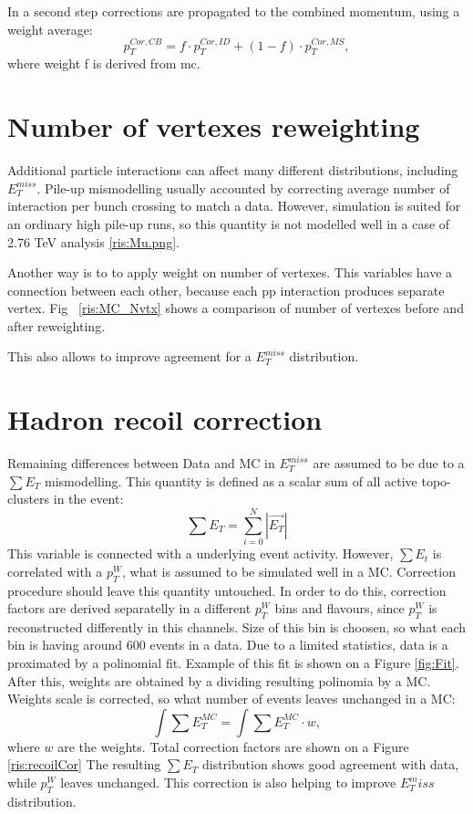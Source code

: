 In a second step corrections are propagated to the combined momentum, using a weight average:
\begin{equation}
p_T^{Cor,CB}= f\cdot p_T^{Cor,ID}+(1-f) \cdot p_T^{Cor,MS},
\end{equation}
where weight f is derived from mc. 

\section{Number of vertexes reweighting}
Additional particle interactions can affect many different distributions, including $E_T^{miss}$. Pile-up mismodelling usually accounted by correcting average number of interaction per bunch crossing to match a data. However, \atlas simulation is suited for an ordinary high pile-up runs, so this quantity is not modelled well in a case of 2.76 TeV analysis \ref{ris:Mu.png}. 

Another way is to to apply weight on number of vertexes. This variables have a connection between each other, because each pp interaction produces separate vertex. Fig ~\ref{ris:MC_Nvtx} shows a comparison of number of vertexes before and after reweighting.

This also allows to improve agreement for a $E_T^{miss}$ distribution.

\section{Hadron recoil correction}
Remaining differences between Data and MC in $E_T^{miss}$ are assumed to be due to a $\sum E_T$ mismodelling. This quantity is defined as a scalar sum of all active topo-clusters in the event:
\begin{equation}
\sum E_T = \sum\limits^N_{i=0}|\vec{E_T}|
\end{equation}
This variable is connected with a underlying event activity. 
However, $\sum E_t$ is correlated with a $p_T^W$, what is assumed to be simulated well in a MC. Correction procedure should leave this quantity untouched. In order to do this, correction factors are derived separatelly in a different $p_T^W$ bins and flavours, since $p_T^W$ is reconstructed differently in this channels. Size of this bin is choosen, so what each bin is having around 600 events in a data. Due to a limited statistics, data is a proximated by a polinomial fit. Example of this fit is shown on a Figure \ref{fig:Fit}. After this, weights are obtained by a dividing resulting polinomia by a MC. Weights scale is corrected, so what number of events leaves unchanged in a MC:
\begin{equation}
\int \sum E_T^{MC} = \int \sum E_T^{MC} \cdot w,
\end{equation}
where $w$ are the weights. Total correction factors are shown on a Figure \ref{ris:recoilCor}
The resulting $\sum E_T$ distribution shows good agreement with data, while $p_T^W$ leaves unchanged. This correction is also helping to improve $E_T^miss$ distribution.
